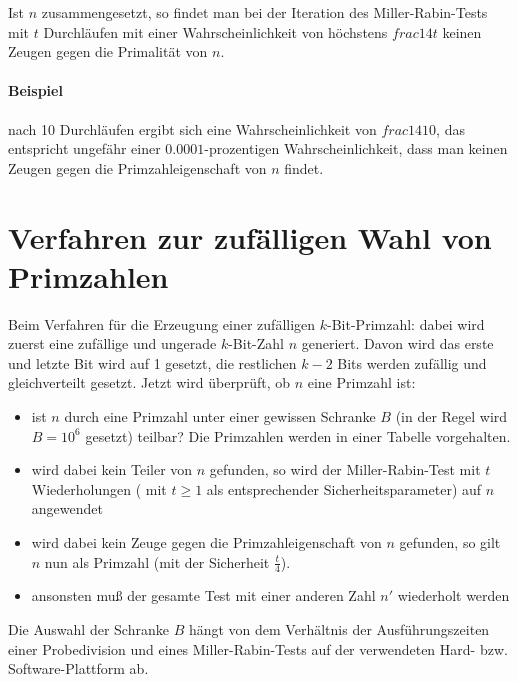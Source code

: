 Ist $n$ zusammengesetzt, so findet man bei der Iteration des Miller-Rabin-Tests mit $t$ Durchläufen mit einer Wahrscheinlichkeit von höchstens $frac14t$ keinen Zeugen 
gegen die Primalität von $n$.

\paragraph{Beispiel} nach 10 Durchläufen ergibt sich eine Wahrscheinlichkeit von $frac14 10$, das entspricht ungefähr einer $0.0001$-prozentigen Wahrscheinlichkeit, 
dass man keinen Zeugen gegen die Primzahleigenschaft von $n$ findet.

\section{Verfahren zur zufälligen Wahl von Primzahlen}

Beim Verfahren für die Erzeugung einer zufälligen $k$-Bit-Primzahl: dabei wird zuerst eine zufällige und ungerade $k$-Bit-Zahl $n$ generiert.
Davon wird das erste und letzte Bit wird auf 1 gesetzt, die restlichen $k-2$ Bits werden zufällig und gleichverteilt gesetzt. 
Jetzt wird überprüft, ob $n$ eine Primzahl ist:
\begin{itemize}
    \item ist $n$ durch eine Primzahl unter einer gewissen Schranke $B$ (in der Regel wird $B = 10^6$ gesetzt) teilbar? Die Primzahlen werden in einer Tabelle vorgehalten.
    \item wird dabei kein Teiler von $n$ gefunden, so wird der Miller-Rabin-Test mit $t$ Wiederholungen ( mit $t \geq 1$ als entsprechender Sicherheitsparameter) auf $n$ 
    angewendet
    \item wird dabei kein Zeuge gegen die Primzahleigenschaft von $n$ gefunden, so gilt $n$ nun als Primzahl (mit der Sicherheit $\frac{t}{4}$).
    \item ansonsten muß der gesamte Test mit einer anderen Zahl $n'$ wiederholt werden
\end{itemize}

Die Auswahl der Schranke $B$ hängt von dem Verhältnis der Ausführungszeiten einer
Probedivision und eines Miller-Rabin-Tests auf der verwendeten Hard- bzw. Software-Plattform ab.